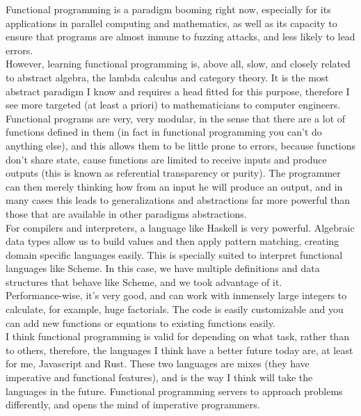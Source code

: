 
Functional programming is a paradigm booming right now, especially for its applications in parallel computing and mathematics, as well as its capacity to ensure that programs are almost inmune to fuzzing attacks, and less likely to lead errors.\\

However, learning functional programming is, above all, slow, and closely related to abstract algebra, the lambda calculus and category theory. It is the most abstract paradigm I know and requires a head fitted for this purpose, therefore I see more targeted (at least a priori) to mathematicians to computer engineers.\\

Functional programs are very, very modular, in the sense that there are a lot of functions defined in them (in fact in functional programming you can't do anything else), and this allows them to be little prone to errors, because functions don't share state, cause functions are limited to receive inputs and produce outputs (this is known as referential transparency or purity). The programmer can then merely thinking how from an input he will produce an output, and in many cases this leads to generalizations and abstractions far more powerful than those that are available in other paradigms abstractions.\\

For compilers and interpreters, a language like Haskell is very powerful. Algebraic data types allow us to build values and then apply pattern matching, creating domain specific languages easily. This is specially suited to interpret functional languages like Scheme. In this case, we have multiple definitions and data structures that behave like Scheme, and we took advantage of it.\\

Performance-wise, it's very good, and can work with inmensely large integers to calculate, for example, huge factorials. The code is easily customizable and you can add new functions or equations to existing functions easily.\\

I think functional programming is valid for depending on what task, rather than to others, therefore, the languages I think have a better future today are, at least for me, Javascript and Rust. These two languages are mixes (they have imperative and functional features), and is the way I think will take the languages in the future. Functional programming servers to approach problems differently, and opens the mind of imperative programmers.\\

